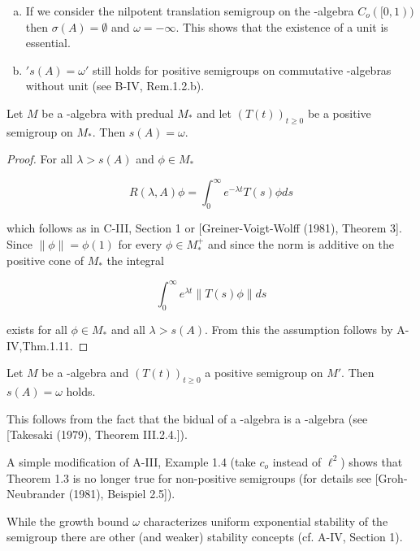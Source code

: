 \newpage


\begin{remark}\label{rem:d4-1.2}
\begin{enumerate}[(a)]
\item
If we consider the nilpotent translation semigroup on the \CA-algebra $C_{o}([0,1))$ then $\sigma(A) = \emptyset$ and $\omega = -\infty$.
This shows that the existence of a unit is essential.

\item
$'s(A) = \omega'$ still holds for positive semigroups on commutative \CA-algebras without unit (see B-IV, Rem.1.2.b).
\end{enumerate}
\end{remark}

\begin{theorem}\label{thm:d4-1.3}
Let $M$ be a \WA-algebra with predual $M_{*}$ and let $(T(t))_{t \geq 0}$ be a positive semigroup on $M_{*}$.
Then $s(A) = \omega$.
\end{theorem}

\begin{proof}
For all $\lambda > s(A)$ and $\phi \in M_{*}$

\[
R(\lambda,A)\phi = \int_{0}^{\infty} e^{-\lambda t}T(s)\phi ds
\]

which follows as in C-III, Section 1 or [Greiner-Voigt-Wolff (1981), Theorem 3].
Since $\|\phi\| = \phi(1)$ for every $\phi \in M_{*}^{+}$ and since the norm is additive on the positive cone of $M_{*}$ the integral

\[
\int_{0}^{\infty} e^{\lambda t}\|T(s)\phi\|ds
\]

exists for all $\phi \in M_{*}$ and all $\lambda > s(A)$.
From this the assumption follows by A-IV,Thm.1.11.
\end{proof}

\begin{corollary}\label{cor:d4-1.4}
Let $M$ be a \CA-algebra and $(T(t))_{t \geq 0}$ a positive semigroup on $M'$.
Then $s(A) = \omega$ holds.
\end{corollary}

This follows from the fact that the bidual of a \CA-algebra is a \WA-algebra (see [Takesaki (1979), Theorem III.2.4.]).

\begin{remark}\label{rem:d4-1.5}
A simple modification of A-III, Example 1.4 (take $c_{o}$ instead of $\ell^2$) shows that Theorem 1.3 is no longer true for non-positive semigroups (for details see [Groh-Neubrander (1981), Beispiel 2.5]).

While the growth bound $\omega$ characterizes uniform exponential stability of the semigroup there are other (and weaker) stability concepts (cf. A-IV, Section 1).
\end{remark}

